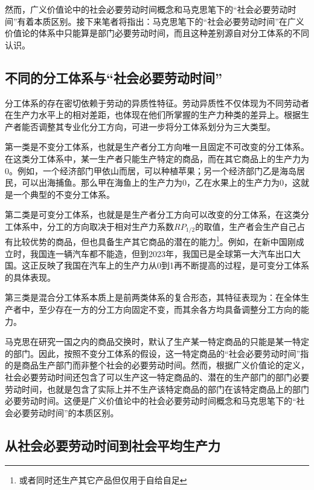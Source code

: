 然而，广义价值论中的社会必要劳动时间概念和马克思笔下的“社会必要劳动时间”有着本质区别。接下来笔者将指出：马克思笔下的“社会必要劳动时间”在广义价值论的体系中只能算是部门必要劳动时间，而且这种差别源自对分工体系的不同认识。

\subsection{不同的分工体系与“社会必要劳动时间”}

分工体系的存在密切依赖于劳动的异质性特征。​​ 劳动异质性不仅体现为不同劳动者在生产力水平上的相对差距，也体现在他们所掌握的生产力种类的差异上。根据生产者能否调整其专业化分工方向，可进一步将分工体系划分为三大类型\cite[111]{CaiJiMingCongXiaYiJieZhiLunDaoGuangYiJieZhiLunXiuDingBan2022}。

第一类是不变分工体系，也就是生产者分工方向唯一且固定不可改变的分工体系\cite[55-56]{CaiJiMingGuangYiJieZhiLun2001}。在这类分工体系中，某一生产者只能生产特定的商品，而在其它商品上的生产力为0。例如，一个经济部门甲依山而居，可以种植苹果；另一个经济部门乙是海岛居民，可以出海捕鱼。那么甲在海鱼上的生产力为0，乙在水果上的生产力为0，这就是一个典型的不变分工体系。

第二类是可变分工体系，也就是是生产者分工方向可以改变的分工体系\cite[55-56]{CaiJiMingGuangYiJieZhiLun2001}，在这类分工体系中，分工的方向取决于相对生产力系数$\mathit{RP}_{1/2}$的取值，生产者会生产自己占有比较优势的商品，但也具备生产其它商品的潜在的能力\footnote{或者同时还生产其它产品但仅用于自给自足}。例如，在新中国刚成立时，我国连一辆汽车都不能造，但到2023年，我国已是全球第一大汽车出口大国\cite{HuangXinZhongGuoZhiZaoQiangJinZhuangGuYouDaXiangQiang2024}。这正反映了我国在汽车上的生产力从0到1再不断提高的过程，是可变分工体系的具体表现。

第三类是混合分工体系本质上是前两类体系的复合形态，其特征表现为：​在全体生产者中，至少存在一方的分工方向固定不变，而其余各方均具备调整分工方向的能力\cite[113]{CaiJiMingCongXiaYiJieZhiLunDaoGuangYiJieZhiLunXiuDingBan2022}。

马克思在研究一国之内的商品交换时，默认了生产某一特定商品的只能是某一特定的部门。因此，按照不变分工体系的假设，这一特定商品的“社会必要劳动时间”指的是商品生产部门而非整个社会的必要劳动时间。然而，根据广义价值论的定义，社会必要劳动时间还包含了可以生产这一特定商品的、潜在的生产部门的部门必要劳动时间，也就是包含了实际上并不生产该特定商品的部门在该特定商品上的部门必要劳动时间。这便是广义价值论中的社会必要劳动时间概念和马克思笔下的“社会必要劳动时间”的本质区别。

\subsection{从社会必要劳动时间到社会平均生产力}

